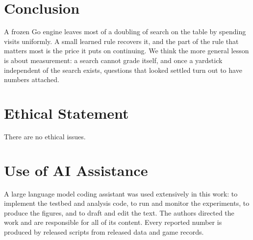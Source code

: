 \documentclass{article}
\begin{document}
\section{Conclusion}

A frozen Go engine leaves most of a doubling of search on the table by spending visits uniformly. A small learned rule recovers it, and the part of the rule that matters most is the price it puts on continuing. We think the more general lesson is about measurement: a search cannot grade itself, and once a yardstick independent of the search exists, questions that looked settled turn out to have numbers attached.

\section*{Ethical Statement}

There are no ethical issues.

\section*{Use of AI Assistance}

A large language model coding assistant was used extensively in this work: to implement the testbed and analysis code, to run and monitor the experiments, to produce the figures, and to draft and edit the text. The authors directed the work and are responsible for all of its content. Every reported number is produced by released scripts from released data and game records.



\end{document}
